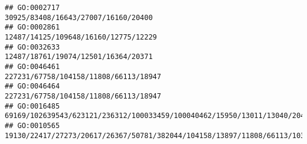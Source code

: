 \documentclass[
]{article}
\begin{document}
\begin{verbatim}
## GO:0002717                                                                                                                                                                                                                                                                                                                                                                          30925/83408/16643/27007/16160/20400
## GO:0002861                                                                                                                                                                                                                                                                                                                                                                         12487/14125/109648/16160/12775/12229
## GO:0032633                                                                                                                                                                                                                                                                                                                                                                          12487/18761/19074/12501/16364/20371
## GO:0046461                                                                                                                                                                                                                                                                                                                                                                        227231/67758/104158/11808/66113/18947
## GO:0046464                                                                                                                                                                                                                                                                                                                                                                        227231/67758/104158/11808/66113/18947
## GO:0016485                                                                                                                                                                                                                                                                                   69169/102639543/623121/236312/100033459/100040462/15950/13011/13040/20423/50909/18791/21922/76884/17228/30060/17287/225908
## GO:0010565                                                                                                                                                                                                                                                                                                                             19130/22417/27273/20617/26367/50781/382044/104158/13897/11808/66113/103142/16149

\end{verbatim}
\end{document}
